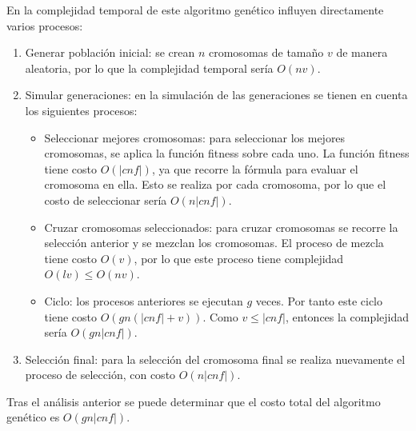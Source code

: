 \documentclass{article}
\begin{document}
            En la complejidad temporal de este algoritmo genético influyen directamente varios procesos:
            \begin{enumerate}
                \item Generar población inicial: se crean $n$ cromosomas de tamaño $v$ de manera 
                aleatoria, por lo que la complejidad temporal sería $O(nv)$.  
                \item Simular generaciones: en la simulación de las generaciones se tienen en cuenta los siguientes
                procesos:
                    \begin{itemize}
                        \item Seleccionar mejores cromosomas: para seleccionar los mejores cromosomas, se aplica la 
                        función fitness sobre cada uno. La función fitness tiene costo $O(|cnf|)$, ya que 
                        recorre la fórmula para evaluar el cromosoma en ella. Esto se realiza por cada cromosoma, 
                        por lo que el costo de seleccionar sería $O(n|cnf|)$.  
                        \item Cruzar cromosomas seleccionados: para cruzar cromosomas se recorre la selección anterior
                        y se mezclan los cromosomas. El proceso de mezcla tiene costo $O(v)$, por lo que este 
                        proceso tiene complejidad $O(lv) \leq O(nv)$. 
                        \item Ciclo: los procesos anteriores se ejecutan $g$ veces. Por tanto 
                        este ciclo tiene costo $O(gn(|cnf|+v))$. Como $v \leq |cnf|$,
                        entonces la complejidad sería $O(gn|cnf|)$.
                    \end{itemize}
                \item Selección final: para la selección del cromosoma final se realiza nuevamente el proceso 
                de selección, con costo $O(n|cnf|)$.
            \end{enumerate}

            Tras el análisis anterior se puede determinar que el costo total del algoritmo genético es $O(gn|cnf|)$. 
\end{document}
